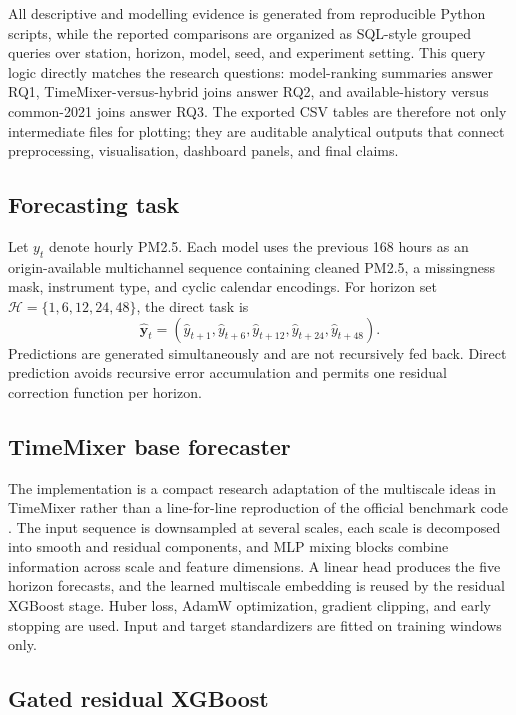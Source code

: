 \documentclass[sn-mathphys-num]{sn-jnl}
\newcommand{\Horizons}{\{1,6,12,24,48\}}
\begin{document}
All descriptive and modelling evidence is generated from reproducible Python
scripts, while the reported comparisons are organized as SQL-style grouped
queries over station, horizon, model, seed, and experiment setting. This query
logic directly matches the research questions: model-ranking summaries answer
RQ1, TimeMixer-versus-hybrid joins answer RQ2, and available-history versus
common-2021 joins answer RQ3. The exported CSV tables are therefore not only
intermediate files for plotting; they are auditable analytical outputs that
connect preprocessing, visualisation, dashboard panels, and final claims.

\subsection{Forecasting task}
\label{sec:problem}

Let \(y_t\) denote hourly PM2.5. Each model uses the previous 168 hours as an
origin-available multichannel sequence containing cleaned PM2.5, a missingness
mask, instrument type, and cyclic calendar encodings. For horizon set
\(\mathcal H=\Horizons\), the direct task is
\begin{equation}
\hat{\mathbf y}_t=
\left(\hat y_{t+1},\hat y_{t+6},\hat y_{t+12},\hat y_{t+24},\hat y_{t+48}\right).
\end{equation}
Predictions are generated simultaneously and are not recursively fed back.
Direct prediction avoids recursive error accumulation and permits one residual
correction function per horizon.

\subsection{TimeMixer base forecaster}
\label{sec:timemixer}

The implementation is a compact research adaptation of the multiscale ideas in
TimeMixer rather than a line-for-line reproduction of the official benchmark
code \cite{wang2024timemixer}. The input sequence is downsampled at several
scales, each scale is decomposed into smooth and residual components, and MLP
mixing blocks combine information across scale and feature dimensions. A
linear head produces the five horizon forecasts, and the learned multiscale
embedding is reused by the residual XGBoost stage. Huber loss, AdamW
optimization, gradient clipping, and early stopping are used. Input and target
standardizers are fitted on training windows only.

\subsection{Gated residual XGBoost}
\label{sec:residual}
\end{document}
